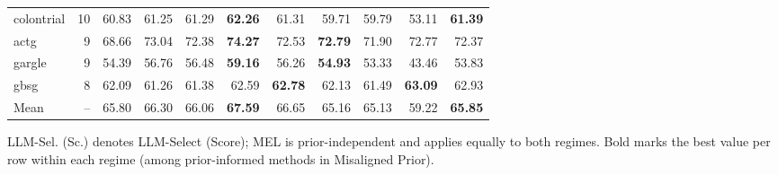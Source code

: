 \begin{table}[!htbp]
\begin{threeparttable}
\begin{tabular}{@{}lr@{\hspace{12pt}}rrrrr@{\hspace{14pt}}rrrr@{}}
colontrial &  10 & 60.83 & 61.25 & 61.29 & \textbf{62.26} & 61.31 & 59.71 & 59.79 & 53.11 & \textbf{61.39} \\
actg       &   9 & 68.66 & 73.04 & 72.38 & \textbf{74.27} & 72.53 & \textbf{72.79} & 71.90 & 72.77 & 72.37 \\
gargle     &   9 & 54.39 & 56.76 & 56.48 & \textbf{59.16} & 56.26 & \textbf{54.93} & 53.33 & 43.46 & 53.83 \\
gbsg       &   8 & 62.09 & 61.26 & 61.38 & 62.59 & \textbf{62.78} & 62.13 & 61.49 & \textbf{63.09} & 62.93 \\
\midrule
Mean       &  -- & 65.80 & 66.30 & 66.06 & \textbf{67.59} & 66.65 & 65.16 & 65.13 & 59.22 & \textbf{65.85} \\
\bottomrule
\end{tabular}
\begin{tablenotes}[flushleft]
\scriptsize
\item LLM-Sel. (Sc.) denotes LLM-Select (Score); MEL is prior-independent and applies equally to both regimes. Bold marks the best value per row within each regime (among prior-informed methods in Misaligned Prior).
\end{tablenotes}
\end{threeparttable}
\end{table}
